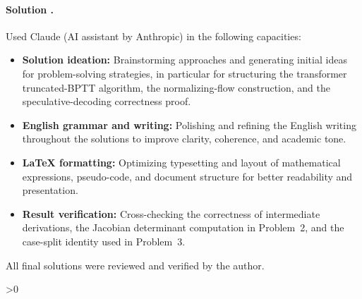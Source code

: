 \documentclass{article}
\newcounter{placeholderCount}
\newcounter{solutionCount}
\newcommand{\solution}[1]{
    \stepcounter{solutionCount}
    \paragraph{Solution \thesolutionCount.}
    {
        #1
    }
}
\begin{document}
\solution{
    Used Claude (AI assistant by Anthropic) in the following capacities:
    \begin{itemize}
        \item \textbf{Solution ideation:} Brainstorming approaches and generating initial ideas for problem-solving strategies, in particular for structuring the transformer truncated-BPTT algorithm, the normalizing-flow construction, and the speculative-decoding correctness proof.
        \item \textbf{English grammar and writing:} Polishing and refining the English writing throughout the solutions to improve clarity, coherence, and academic tone.
        \item \textbf{\LaTeX{} formatting:} Optimizing typesetting and layout of mathematical expressions, pseudo-code, and document structure for better readability and presentation.
        \item \textbf{Result verification:} Cross-checking the correctness of intermediate derivations, the Jacobian determinant computation in Problem~2, and the case-split identity used in Problem~3.
    \end{itemize}
    All final solutions were reviewed and verified by the author.
}

\ifnum\value{placeholderCount}>0
    \vfill
    \begin{center}
        \color{red} 
    \end{center}
\fi
\end{document}
